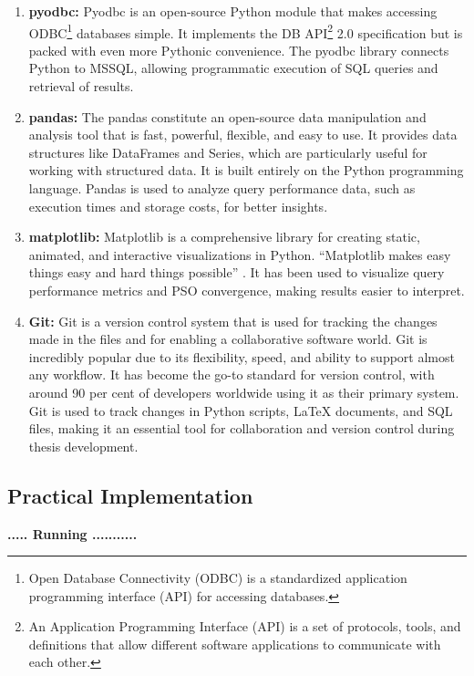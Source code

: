 \begin{enumerate}[label=(\roman*)]
\item\textbf{pyodbc:} Pyodbc is an open-source Python module that makes accessing ODBC\footnote{Open Database Connectivity (ODBC) is a standardized application programming interface (API) for accessing databases.} databases simple. It implements the DB API\footnote{An Application Programming Interface (API) is a set of protocols, tools, and definitions that allow different software applications to communicate with each other.} 2.0 specification but is packed with even more Pythonic convenience. The pyodbc library connects Python to MSSQL, allowing programmatic execution of SQL queries and retrieval of results.

\item\textbf{pandas:} The pandas constitute an open-source data manipulation and analysis tool that is fast, powerful, flexible, and easy to use. It provides data structures like DataFrames and Series, which are particularly useful for working with structured data. It is built entirely on the Python programming language. Pandas is used to analyze query performance data, such as execution times and storage costs, for better insights.

\item\textbf{matplotlib:} Matplotlib is a comprehensive library for creating static, animated, and interactive visualizations in Python. \enquote{Matplotlib makes easy things easy and hard things possible} \cite{matplotlib}. It has been used to visualize query performance metrics and PSO convergence, making results easier to interpret.

\item\textbf{Git:} Git is a version control system that is used for tracking the changes made in the files and for enabling a collaborative software world. Git is incredibly popular due to its flexibility, speed, and ability to support almost any workflow. It has become the go-to standard for version control, with around 90 per cent of developers worldwide using it as their primary system. Git is used to track changes in Python scripts, LaTeX documents, and SQL files, making it an essential tool for collaboration and version control during thesis development.

\end{enumerate}

\clearpage

\subsection{Practical Implementation }
 \begin{center}
     \textbf{..... Running ...........}
 \end{center}
